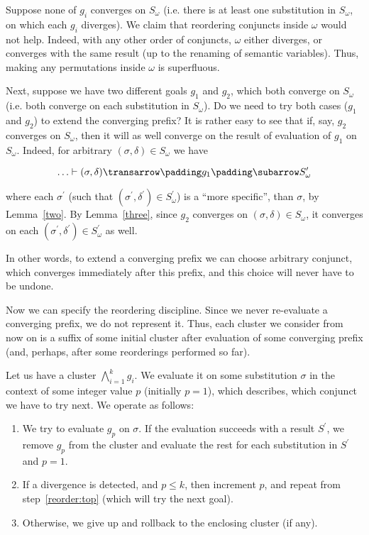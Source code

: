 Suppose none of $g_i$ converges on $S_\omega$ (i.e. there is at least one substitution in $S_\omega$, on which
each $g_i$ diverges). We claim that reordering conjuncts inside $\omega$ would not help. Indeed, with any other order
of conjuncts, $\omega$ either diverges, or converges with the same result (up to the renaming of semantic variables). Thus,
making any permutations inside $\omega$ is superfluous.

Next, suppose we have two different goals $g_1$ and $g_2$, which both converge on $S_\omega$ (i.e. both converge on each
substitution in $S_\omega$). Do we need to try both cases ($g_1$ and $g_2$) to extend the converging prefix?
It is rather easy to see that if, say, $g_2$ converges on $S_\omega$, then it will as well converge on the result of evaluation
of $g_1$ on $S_\omega$. Indeed, for arbitrary \mbox{$(\sigma, \delta)\in S_\omega$} we have

\[
\otrans{\dots}{(\sigma, \delta)}{g_1}{S^\prime_\omega}
\]

where each $\sigma^\prime$ (such that \mbox{$(\sigma^\prime, \delta^\prime)\in S^\prime_\omega$}) is a ``more specific'', than $\sigma$, by Lemma~\ref{two}. By Lemma~\ref{three}, since $g_2$ converges on \mbox{$(\sigma, \delta)\in S_\omega$}, it converges on each \mbox{$(\sigma^\prime, \delta^\prime)\in S^\prime_\omega$} as well.

In other words, to extend a converging prefix we can choose arbitrary conjunct, which converges immediately
after this prefix, and this choice will never have to be undone.

Now we can specify the reordering discipline. Since we never re-evaluate a converging prefix, we do not
represent it. Thus, each cluster we consider from now on is a suffix of some initial cluster after
evaluation of some converging prefix (and, perhaps, after some reorderings performed so far).

Let us have a cluster \mbox{$\bigwedge_{i=1}^k g_i$}. We evaluate it on some substitution $\sigma$ in the context of some integer
value $p$ (initially $p=1$), which describes, which conjunct we have to try next. We operate as follows:

\begin{enumerate}
\item\label{reorder:top} We try to evaluate $g_p$ on $\sigma$. If the evaluation succeeds with a result $S^\prime$, we 
remove $g_p$ from the cluster and evaluate the rest for each substitution in $S^\prime$ and $p=1$.
  
\item If a divergence is detected, and $p\le k$, then increment $p$, and repeat from step~\ref{reorder:top} (which will try the next goal).
  
\item Otherwise, we give up and rollback to the enclosing cluster (if any).
\end{enumerate}

